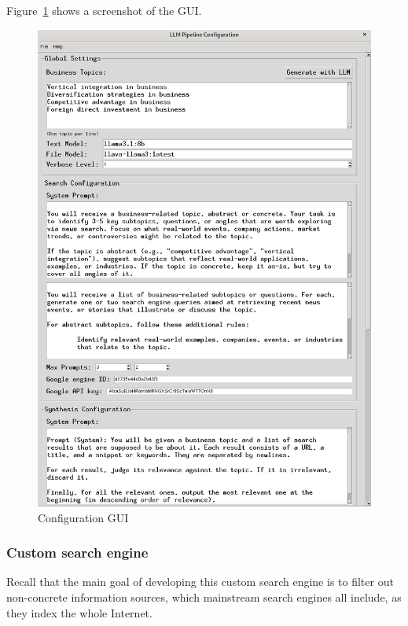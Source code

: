 \documentclass[final-report]{report-template}
\begin{document}
Figure~\ref{fig.config.gui} shows a screenshot of the GUI.
\begin{figure}[hbtp!]
	\centering
	\includegraphics[height=.25\textheight]{res/gui.png}
	\caption{Configuration GUI}
	\label{fig.config.gui}
\end{figure}

\subsubsection{Custom search engine}
Recall that the main goal of developing this custom search engine is to 
filter out non-concrete information sources, which mainstream search engines
all include, as they index the whole Internet.
\end{document}
